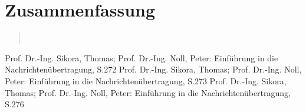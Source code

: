     
\section{Zusammenfassung}
\begin{quote}

     \\
\end{quote}%
         



\begin{thebibliography}{999}
  Prof. Dr.-Ing. Sikora, Thomas; Prof. Dr.-Ing. Noll, Peter: Einführung in die
 Nachrichtenübertragung, S.272
 Prof. Dr.-Ing. Sikora, Thomas; Prof. Dr.-Ing. Noll, Peter: Einführung in die
 Nachrichtenübertragung, S.273
 Prof. Dr.-Ing. Sikora, Thomas; Prof. Dr.-Ing. Noll, Peter: Einführung in die
 Nachrichtenübertragung, S.276
 



\end{thebibliography}


  	    
